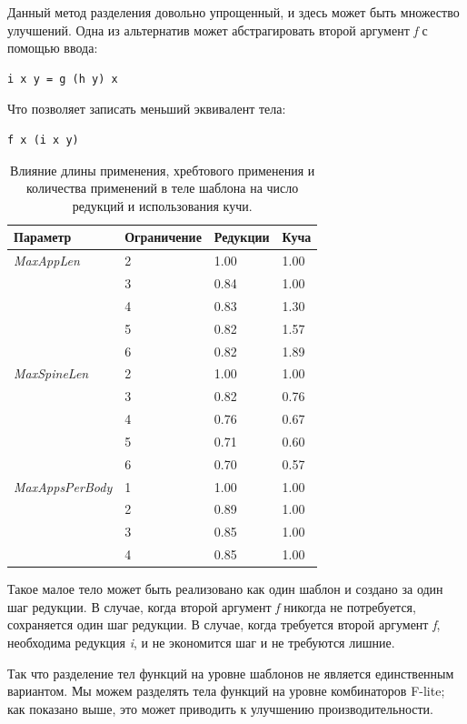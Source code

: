 \documentclass[flenqn, 14pt]{extarticle}
\begin{document}
Данный метод разделения довольно упрощенный, и здесь может быть множество улучшений. Одна из альтернатив может абстрагировать второй аргумент \textit{f} с помощью ввода:
\begin{verbatim}
i x y = g (h y) x
\end{verbatim}

Что позволяет записать меньший эквивалент тела:
\begin{verbatim}
f x (i x y)
\end{verbatim}

\begin{table}
\centering
\caption{Влияние длины применения, хребтового применения и количества применений в теле шаблона на число редукций и использования кучи.}
\label{tab:bounds_effect}
\begin{tabularx}{\textwidth}{XXXX}
\hline\hline
Параметр & Ограничение & Редукции & Куча \\
\hline
\textit{MaxAppLen} & 2 & 1.00 & 1.00 \\
& 3 & 0.84 & 1.00 \\
& 4 & 0.83 & 1.30 \\
& 5 & 0.82 & 1.57 \\
& 6 & 0.82 & 1.89 \\
\hline
\textit{MaxSpineLen} & 2 & 1.00 & 1.00 \\
& 3 & 0.82 & 0.76 \\
& 4 & 0.76 & 0.67 \\
& 5 & 0.71 & 0.60 \\
& 6 & 0.70 & 0.57 \\
\hline
\textit{MaxAppsPerBody} & 1 & 1.00 & 1.00 \\
& 2 & 0.89 & 1.00 \\
& 3 & 0.85 & 1.00 \\
& 4 & 0.85 & 1.00 \\
\hline\hline
\end{tabularx}
\end{table} 

Такое малое тело может быть реализовано как один шаблон и создано за один шаг редукции. В случае, когда второй аргумент \textit{f} никогда не потребуется, сохраняется один шаг редукции. В случае, когда требуется второй аргумент \textit{f}, необходима редукция \textit{i}, и не экономится шаг и не требуются лишние.

Так что разделение тел функций на уровне шаблонов не является единственным вариантом. Мы можем разделять тела функций на уровне комбинаторов F-lite; как показано выше, это может приводить к улучшению производительности.
\end{document}
